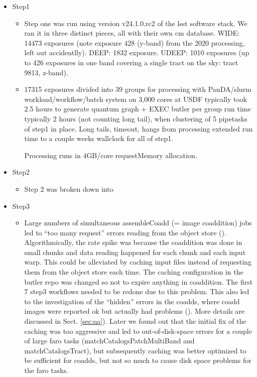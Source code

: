 \begin{itemize}

\item Step1
\begin{itemize}

  \item
Step one was run using version v24.1.0.rc2 of the lsst software stack. We ran it in three distinct pieces, all with their own cm database.  WIDE: 14473 exposures (note exposure 428 (y-band) from the 2020 processing, left out accidentlly). DEEP: 1832 exposure. UDEEP: 1010 exposures (up to 426  exposures in one band covering a single tract on the sky: tract 9813, z-band).
  \item

17315 exposures divided into 39 groups for processing with PanDA/slurm workload/workflow/batch system on 3,000 cores at USDF typically took 2.5 hours to generate quantum graph + EXEC butler per group run time typically 2 hours (not counting long tail), when clustering of 5 pipetasks of step1 in place. Long tails, timeout, hangs from processing extended run time to a couple weeks wallclock for all of step1.

Processing runs in 4GB/core requestMemory allocation.


\end{itemize} %

\item Step2
\begin{itemize}

 \item
Step 2 was broken down into 

\end{itemize} %

\item Step3
\begin{itemize}

  \item
  Large numbers of simultaneous assembleCoadd (= image coaddition) jobs led to ``too many request'' errors reading from the object store ().
  Algorithmically, the rate spike was because the coaddition was done in small chunks and data reading happened for each chunk and each input warp.
  This could be alleviated by caching input files instead of requesting them from the object store each time.
  The caching configuration in the butler repo was changed so not to expire anything in coaddition.
  The first 7 step3 workflows needed to be redone due to this problem.
  This also led to the investigation of the ``hidden'' errors in the coadds, where coadd images were reported ok but actually had problems ().
  More details are discussed in Sect. \ref{sec:qa}).
  Later we found out that the initial fix of the caching was too aggressive and led to out-of-disk-space errors for a couple of large faro tasks (matchCatalogsPatchMultiBand and matchCatalogsTract), but subsequently caching was better optimized to be sufficient for coadds, but not so much to cause disk space problems for the faro tasks.


\end{itemize}
\end{itemize}
